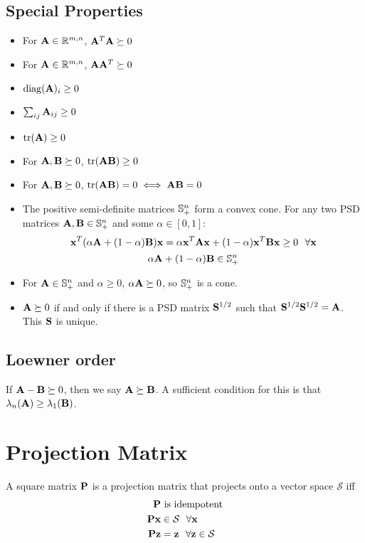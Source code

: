 \subsection*{Special Properties}
\begin{itemize}
\item For $\mathbf{A}\in\mathbb{R}^{m,n}$, $\mathbf{A}^T\mathbf{A}\succeq0$
\item For $\mathbf{A}\in\mathbb{R}^{m,n}$, $\mathbf{A}\mathbf{A}^T\succeq0$
\item $\operatorname{diag}(\mathbf{A})_i\ge0$
\item $\sum_{ij} \mathbf{A}_{ij}\ge0$
\item $\operatorname{tr}(\mathbf{A})\ge0$
\item For $\mathbf{A},\mathbf{B}\succeq0$, $\operatorname{tr}(\mathbf{A}\mathbf{B})\ge0$
\item For $\mathbf{A},\mathbf{B}\succeq0$, $\operatorname{tr}(\mathbf{A}\mathbf{B})=0\iff \mathbf{A}\mathbf{B}=0$
\item The positive semi-definite matrices $\mathbb{S}^n_+$ form a convex cone. For any two PSD matrices $\mathbf{A},\mathbf{B}\in\mathbb{S}^n_+$ and some $\alpha\in[0,1]$:
\begin{equation}
\mathbf{x}^T(\alpha\mathbf{A}+(1-\alpha)\mathbf{B})\mathbf{x}=\alpha \mathbf{x}^T\mathbf{A}\mathbf{x}+(1-\alpha)\mathbf{x}^T\mathbf{B}\mathbf{x}\ge0~~\forall\mathbf{x}
\end{equation}
\begin{equation}
\alpha\mathbf{A}+(1-\alpha)\mathbf{B}\in\mathbb{S}^n_+
\end{equation}
\item For $\mathbf{A}\in\mathbb{S}^n_+$ and $\alpha\ge0$, $\alpha\mathbf{A}\succeq0$, so $\mathbb{S}^n_+$ is a cone.
\item $\mathbf{A}\succeq 0$ if and only if there is a PSD matrix $\mathbf{S}^{1/2}$ such that $\mathbf{S}^{1/2}\mathbf{S}^{1/2}=\mathbf{A}$. This $\mathbf{S}$ is unique.
\end{itemize}

\subsection{Loewner order}
If $\mathbf{A}-\mathbf{B}\succeq 0$, then we say $\mathbf{A}\succeq \mathbf{B}$. A sufficient condition for this is that $\lambda_n(\mathbf{A})\ge\lambda_1(\mathbf{B})$.



\section{Projection Matrix}
A square matrix $\mathbf{P}$ is a projection matrix that projects onto a vector space $\mathcal{S}$ iff
\begin{align}
\mathbf{P}&~\textrm{is idempotent} \\
\mathbf{P}\mathbf{x}&\in\mathcal{S}~~\forall\mathbf{x} \\
\mathbf{P}\mathbf{z}&=\mathbf{z}~~\forall\mathbf{z}\in\mathcal{S}
\end{align}


